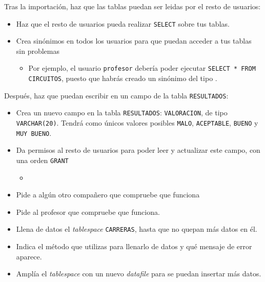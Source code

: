 \begin{homeworkProblem}
  Tras la importación, haz que las tablas puedan ser leidas por el resto de usuarios:
  \begin{itemize}
  \item Haz que el resto de usuarios pueda realizar \texttt{SELECT} sobre tus tablas.  
  \item Crea sinónimos en todos los usuarios para que puedan acceder a tus tablas sin problemas
    \begin{itemize}
    \item Por ejemplo, el usuario \texttt{profesor} debería poder ejecutar \texttt{SELECT * FROM CIRCUITOS}, puesto que habrás creado un sinónimo del tipo .
    \end{itemize}
  \end{itemize}

  Después, haz que puedan escribir en un campo de la tabla \texttt{RESULTADOS}:
  \begin{itemize}
  \item Crea un nuevo campo en la tabla \texttt{RESULTADOS}: \texttt{VALORACION}, de tipo \texttt{VARCHAR(20)}. Tendrá como únicos valores posibles \texttt{MALO}, \texttt{ACEPTABLE}, \texttt{BUENO} y \texttt{MUY BUENO}.
    
  \item Da permisos al resto de usuarios para poder leer y actualizar este campo, con una orden \texttt{GRANT}
    \begin{itemize}
    \item {}
    \end{itemize}

  \item Pide a algún otro compañero que compruebe que funciona
  \item Pide al profesor que compruebe que funciona.

  \end{itemize}
\end{homeworkProblem}

\begin{homeworkProblem}
  \begin{itemize}
  \item Llena de datos el \textit{tablespace} \texttt{CARRERAS}, hasta que no quepan más datos en él.
  \item Indica el método que utilizas para llenarlo de datos y qué mensaje de error aparece.
  \item Amplía el \textit{tablespace}  con un nuevo \textit{datafile} para se puedan insertar más datos.
  \end{itemize}
\end{homeworkProblem}

